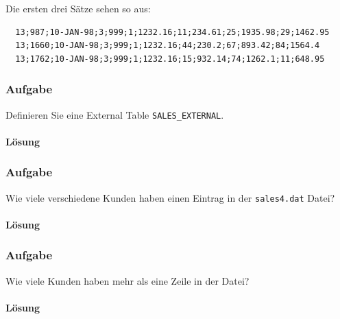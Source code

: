 Die ersten drei Sätze sehen so aus:
\begin{verbatim}
  13;987;10-JAN-98;3;999;1;1232.16;11;234.61;25;1935.98;29;1462.95
  13;1660;10-JAN-98;3;999;1;1232.16;44;230.2;67;893.42;84;1564.4
  13;1762;10-JAN-98;3;999;1;1232.16;15;932.14;74;1262.1;11;648.95
\end{verbatim}


\subsubsection{Aufgabe}
\label{subsec:uebung_12.aufgabe_01a}
Definieren Sie eine External Table \texttt{SALES\_EXTERNAL}.

\paragraph{Lösung}
\label{subsubsec:uebung_12.aufgabe_01a.loesung}


\subsubsection{Aufgabe}
\label{subsec:uebung_12.aufgabe_01b}
Wie viele verschiedene Kunden haben einen Eintrag in der \texttt{sales4.dat} Datei?

\paragraph{Lösung}
\label{subsubsec:uebung_12.aufgabe_01b.loesung}


\subsubsection{Aufgabe}
\label{subsec:uebung_12.aufgabe_01c}
Wie viele Kunden haben mehr als eine Zeile in der Datei?

\paragraph{Lösung}
\label{subsubsec:uebung_12.aufgabe_01c.loesung}


